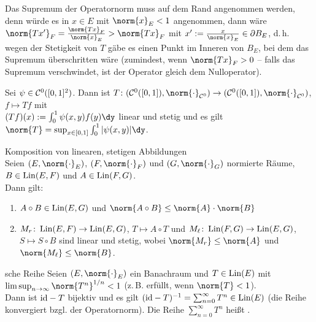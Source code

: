 \begin{Bem}
    Das Supremum der Operatornorm muss auf dem Rand angenommen werden,
    denn würde es in $x \in E$ mit $\norm{x}_E < 1$ angenommen,
    dann wäre $\norm{Tx'}_F = \frac{\norm{Tx}_F}{\norm{x}_E} > \norm{Tx}_F$ mit
    $x' := \frac{x}{\norm{x}_E} \in \partial B_E$,
    d.\,h. wegen der Stetigkeit von $T$ gäbe es einen Punkt im Inneren von $B_E$,
    bei dem das Supremum überschritten wäre
    (zumindest, wenn $\norm{Tx}_F > 0$ -- falls das Supremum verschwindet, ist der
    Operator gleich dem Nulloperator).
\end{Bem}

\begin{Bsp}
    Sei $\psi \in \mathcal{C}^0([0, 1]^2)$.
    Dann ist $T\colon (\C^0([0, 1]), \norm{\cdot}_{\C^0}) \rightarrow
    (\C^0([0, 1]), \norm{\cdot}_{\C^0})$, $f \mapsto Tf$ mit\\
    $(Tf)(x) := \int_0^1 \psi(x, y) f(y)\dy$ linear und stetig und es gilt
    $\norm{T} = \sup_{x \in [0, 1]} \int_0^1 |\psi(x, y)| \dy$.
\end{Bsp}

\linie

\begin{Lemma}{Komposition von linearen, stetigen Abbildungen}\\
    Seien $(E, \norm{\cdot}_E)$, $(F, \norm{\cdot}_F)$ und $(G, \norm{\cdot}_G)$
    normierte Räume,
    $B \in \operatorname{Lin}(E, F)$ und $A \in \operatorname{Lin}(F, G)$.\\
    Dann gilt:
    \begin{enumerate}
        \item
        $A \circ B \in \operatorname{Lin}(E, G)$ und
        $\norm{A \circ B} \le \norm{A} \cdot \norm{B}$

        \item
        $M_r\colon \operatorname{Lin}(E, F) \rightarrow \operatorname{Lin}(E, G)$, $T \mapsto A \circ T$ und
        $M_\ell\colon \operatorname{Lin}(F, G) \rightarrow \operatorname{Lin}(E, G)$, $S \mapsto S \circ B$
        sind linear und stetig, wobei
        $\norm{M_r} \le \norm{A}$ und $\norm{M_\ell} \le \norm{B}$.
    \end{enumerate}
\end{Lemma}

\begin{Satz}{sche Reihe}
    Seien $(E, \norm{\cdot}_E)$ ein Banachraum und $T \in \operatorname{Lin}(E)$ mit\\
    $\limsup_{n \to \infty} \norm{T^n}^{1/n} < 1$
    (z.\,B. erfüllt, wenn $\norm{T} < 1$).\\
    Dann ist $\text{id} - T$ bijektiv und es gilt
    $(\text{id} - T)^{-1} = \sum_{n=0}^\infty T^n \in \operatorname{Lin}(E)$
    (die Reihe konvergiert bzgl. der Operatornorm).
    Die Reihe $\sum_{n=0}^\infty T^n$ heißt .
\end{Satz}

